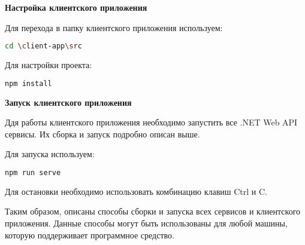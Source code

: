 \bigskip
\textbf{Настройка клиентского приложения}

Для перехода в папку клиентского приложения используем:

\begin{lstlisting}[language=bash]
cd \client-app\src
\end{lstlisting}

Для настройки проекта:
\begin{lstlisting}[language=bash]
npm install
\end{lstlisting}

\bigskip
\textbf{Запуск клиентского приложения}

Ддя работы клиентского приложения необходимо запустить все .NET Web API сервисы. Их сборка и запуск подробно описан выше.

Для запуска используем:
\begin{lstlisting}[language=bash]
npm run serve
\end{lstlisting}

Для остановки необходимо использовать комбинацию клавиш Ctrl и C.

Таким образом, описаны способы сборки и запуска всех сервисов и клиентского приложения. Данные способы могут быть использованы для любой машины, которую поддерживает программное средство.